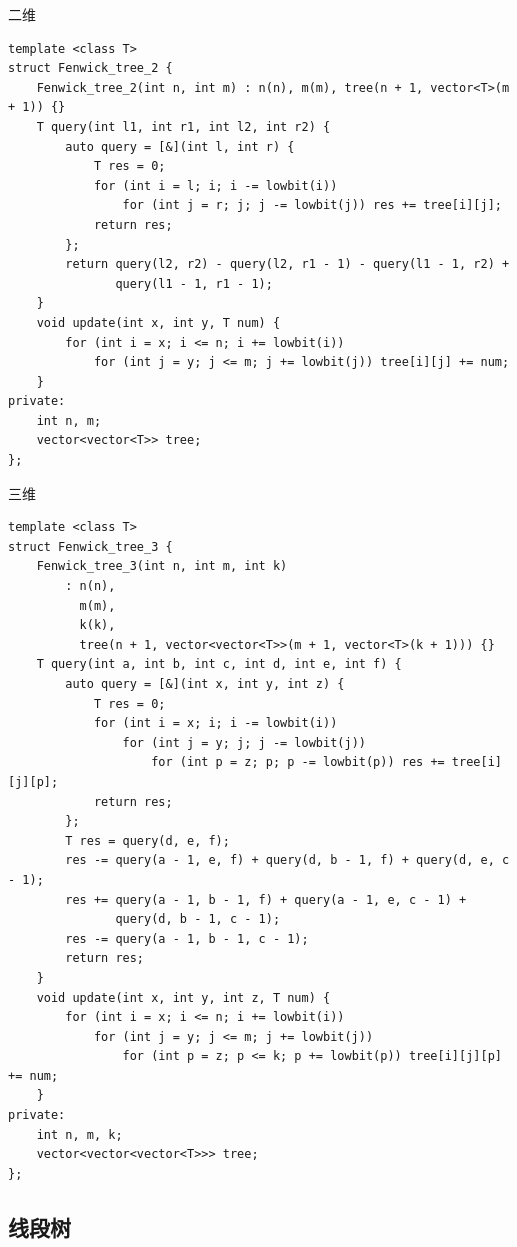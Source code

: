 \documentclass[UTF8]{ctexart}
\begin{document}
\begin{sloppypar}
二维

\begin{lstlisting}[style=cpp]
template <class T>
struct Fenwick_tree_2 {
    Fenwick_tree_2(int n, int m) : n(n), m(m), tree(n + 1, vector<T>(m + 1)) {}
    T query(int l1, int r1, int l2, int r2) {
        auto query = [&](int l, int r) {
            T res = 0;
            for (int i = l; i; i -= lowbit(i))
                for (int j = r; j; j -= lowbit(j)) res += tree[i][j];
            return res;
        };
        return query(l2, r2) - query(l2, r1 - 1) - query(l1 - 1, r2) +
               query(l1 - 1, r1 - 1);
    }
    void update(int x, int y, T num) {
        for (int i = x; i <= n; i += lowbit(i))
            for (int j = y; j <= m; j += lowbit(j)) tree[i][j] += num;
    }
private:
    int n, m;
    vector<vector<T>> tree;
};
\end{lstlisting}

三维

\begin{lstlisting}[style=cpp]
template <class T>
struct Fenwick_tree_3 {
    Fenwick_tree_3(int n, int m, int k)
        : n(n),
          m(m),
          k(k),
          tree(n + 1, vector<vector<T>>(m + 1, vector<T>(k + 1))) {}
    T query(int a, int b, int c, int d, int e, int f) {
        auto query = [&](int x, int y, int z) {
            T res = 0;
            for (int i = x; i; i -= lowbit(i))
                for (int j = y; j; j -= lowbit(j))
                    for (int p = z; p; p -= lowbit(p)) res += tree[i][j][p];
            return res;
        };
        T res = query(d, e, f);
        res -= query(a - 1, e, f) + query(d, b - 1, f) + query(d, e, c - 1);
        res += query(a - 1, b - 1, f) + query(a - 1, e, c - 1) +
               query(d, b - 1, c - 1);
        res -= query(a - 1, b - 1, c - 1);
        return res;
    }
    void update(int x, int y, int z, T num) {
        for (int i = x; i <= n; i += lowbit(i))
            for (int j = y; j <= m; j += lowbit(j))
                for (int p = z; p <= k; p += lowbit(p)) tree[i][j][p] += num;
    }
private:
    int n, m, k;
    vector<vector<vector<T>>> tree;
};
\end{lstlisting}

\subsection{线段树}


\end{sloppypar}
\end{document}
